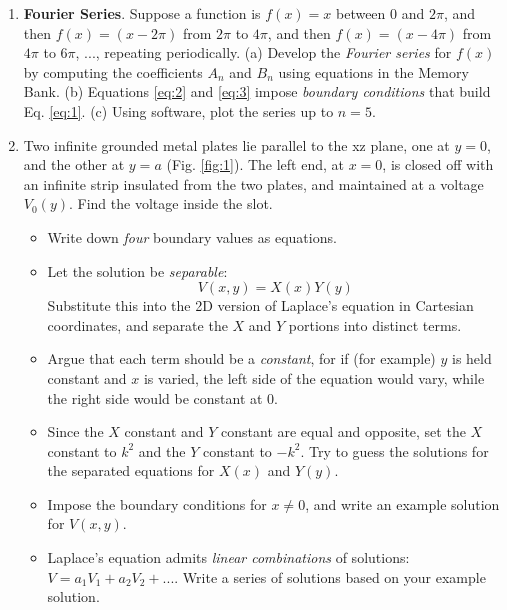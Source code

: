 \documentclass[10pt]{article}
\begin{document}
\begin{enumerate}
\item \textbf{Fourier Series}.  Suppose a function is $f(x)=x$ between 0 and $2\pi$, and then $f(x) = (x-2\pi)$ from $2\pi$ to $4\pi$, and then $f(x) = (x-4\pi)$ from $4\pi$ to $6\pi$, ..., repeating periodically.  (a) Develop the \textit{Fourier series} for $f(x)$ by computing the coefficients $A_n$ and $B_n$ using equations in the Memory Bank.  (b) Equations \ref{eq:2} and \ref{eq:3} impose \textit{boundary conditions} that build Eq. \ref{eq:1}. (c) Using software, plot the series up to $n=5$. \\ \vspace{5cm}
\item Two infinite grounded metal plates lie parallel to the xz plane, one at $y=0$, and the other at $y=a$ (Fig. \ref{fig:1}).  The left end, at $x=0$, is closed off with an infinite strip insulated from the two plates, and maintained at a voltage $V_0(y)$.  Find the voltage inside the slot.
\begin{itemize}
\item Write down \textit{four} boundary values as equations. \\ \vspace{0.5cm}
\item Let the solution be \textit{separable}:
\begin{equation}
V(x,y) = X(x) Y(y)
\end{equation}
Substitute this into the 2D version of Laplace's equation in Cartesian coordinates, and separate the $X$ and $Y$ portions into distinct terms. \\ \vspace{1cm}
\item Argue that each term should be a \textit{constant}, for if (for example) $y$ is held constant and $x$ is varied, the left side of the equation would vary, while the right side would be constant at 0.
\item Since the $X$ constant and $Y$ constant are equal and opposite, set the $X$ constant to $k^2$ and the $Y$ constant to $-k^2$.  Try to guess the solutions for the separated equations for $X(x)$ and $Y(y)$. \\ \vspace{2cm}
\item Impose the boundary conditions for $x\neq 0$, and write an example solution for $V(x,y)$. \\ \vspace{2cm}
\item Laplace's equation admits \textit{linear combinations} of solutions: $V = a_1 V_1 + a_2 V_2 + ...$.  Write a series of solutions based on your example solution.
\end{itemize}
\end{enumerate}
\end{document}
